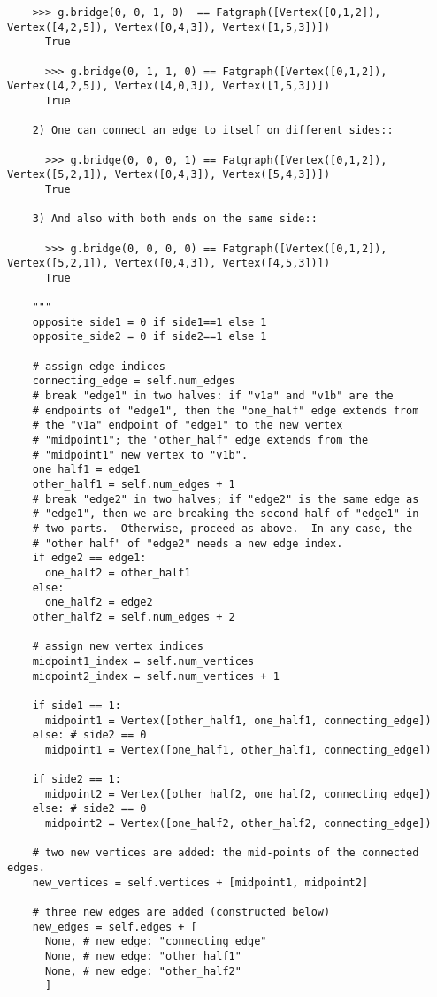 \begin{lstlisting}
    >>> g.bridge(0, 0, 1, 0)  == Fatgraph([Vertex([0,1,2]), Vertex([4,2,5]), Vertex([0,4,3]), Vertex([1,5,3])])
      True
      
      >>> g.bridge(0, 1, 1, 0) == Fatgraph([Vertex([0,1,2]), Vertex([4,2,5]), Vertex([4,0,3]), Vertex([1,5,3])])
      True

    2) One can connect an edge to itself on different sides::
    
      >>> g.bridge(0, 0, 0, 1) == Fatgraph([Vertex([0,1,2]), Vertex([5,2,1]), Vertex([0,4,3]), Vertex([5,4,3])])
      True

    3) And also with both ends on the same side::
    
      >>> g.bridge(0, 0, 0, 0) == Fatgraph([Vertex([0,1,2]), Vertex([5,2,1]), Vertex([0,4,3]), Vertex([4,5,3])])
      True
      
    """
    opposite_side1 = 0 if side1==1 else 1
    opposite_side2 = 0 if side2==1 else 1

    # assign edge indices
    connecting_edge = self.num_edges
    # break "edge1" in two halves: if "v1a" and "v1b" are the
    # endpoints of "edge1", then the "one_half" edge extends from
    # the "v1a" endpoint of "edge1" to the new vertex
    # "midpoint1"; the "other_half" edge extends from the
    # "midpoint1" new vertex to "v1b".
    one_half1 = edge1
    other_half1 = self.num_edges + 1
    # break "edge2" in two halves; if "edge2" is the same edge as
    # "edge1", then we are breaking the second half of "edge1" in
    # two parts.  Otherwise, proceed as above.  In any case, the
    # "other half" of "edge2" needs a new edge index.
    if edge2 == edge1:
      one_half2 = other_half1
    else:
      one_half2 = edge2
    other_half2 = self.num_edges + 2

    # assign new vertex indices
    midpoint1_index = self.num_vertices
    midpoint2_index = self.num_vertices + 1

    if side1 == 1:
      midpoint1 = Vertex([other_half1, one_half1, connecting_edge])
    else: # side2 == 0
      midpoint1 = Vertex([one_half1, other_half1, connecting_edge])

    if side2 == 1:
      midpoint2 = Vertex([other_half2, one_half2, connecting_edge])
    else: # side2 == 0
      midpoint2 = Vertex([one_half2, other_half2, connecting_edge])

    # two new vertices are added: the mid-points of the connected edges.
    new_vertices = self.vertices + [midpoint1, midpoint2]

    # three new edges are added (constructed below)
    new_edges = self.edges + [
      None, # new edge: "connecting_edge"
      None, # new edge: "other_half1"
      None, # new edge: "other_half2"
      ]
    

\end{lstlisting}

